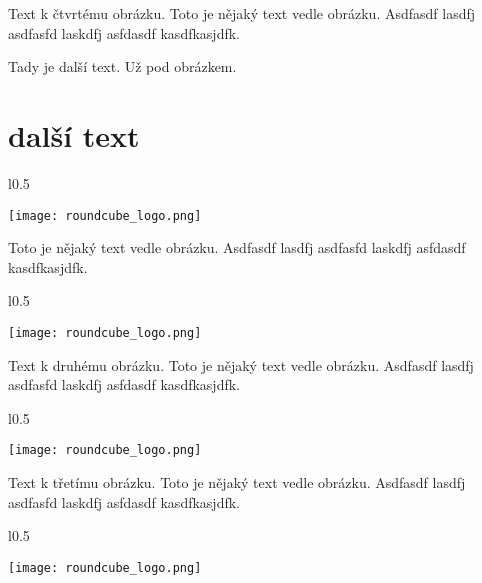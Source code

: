 \documentclass[12pt,a4paper,twoside]{book}
\begin{document}
Text k čtvrtému obrázku. Toto je nějaký text vedle obrázku. Asdfasdf lasdfj asdfasfd laskdfj asfdasdf kasdfkasjdfk.
\newline


Tady je další text. Už pod obrázkem.

\section{další  text}

\begin{wrapfigure}{l}{0.5\textwidth}
  \vspace{-30pt}
  \begin{center}
    \texttt{[image: roundcube\_logo.png]}
  \end{center}
  \vspace{-10pt}
\end{wrapfigure}

Toto je nějaký text vedle obrázku. Asdfasdf lasdfj asdfasfd laskdfj asfdasdf kasdfkasjdfk.
\newline

\begin{wrapfigure}{l}{0.5\textwidth}
  \vspace{-20pt}
  \begin{center}
    \texttt{[image: roundcube\_logo.png]}
  \end{center}
  \vspace{-20pt}
\end{wrapfigure}

Text k druhému obrázku. Toto je nějaký text vedle obrázku. Asdfasdf lasdfj asdfasfd laskdfj asfdasdf kasdfkasjdfk.
\newline

\begin{wrapfigure}{l}{0.5\textwidth}
  \vspace{-20pt}
  \begin{center}
    \texttt{[image: roundcube\_logo.png]}
  \end{center}
  \vspace{-20pt}
\end{wrapfigure}

Text k třetímu obrázku. Toto je nějaký text vedle obrázku. Asdfasdf lasdfj asdfasfd laskdfj asfdasdf kasdfkasjdfk.
\newline

\begin{wrapfigure}{l}{0.5\textwidth}
  \vspace{-20pt}
  \begin{center}
    \texttt{[image: roundcube\_logo.png]}
  \end{center}
  \vspace{-20pt}
\end{wrapfigure}
\end{document}
